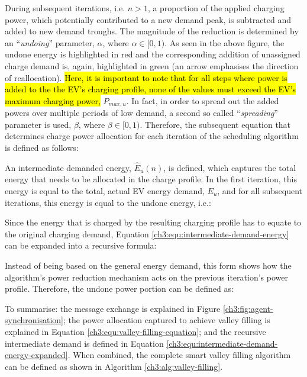 During subsequent iterations, i.e. $n>1$, a proportion of the applied charging power, which potentially contributed to a new demand peak, is subtracted and added to new demand troughs.
The magnitude of the reduction is determined by an ``\textit{undoing}'' parameter, $\alpha$, where $\alpha \in [0, 1)$.
As seen in the above figure, the undone energy is highlighted in red and the corresponding addition of unassigned charge demand is, again, highlighted in green (an arrow emphasises the direction of reallocation).
\hl{Here, it is important to note that for all steps where power is added to the the EV's charging profile, none of the values must exceed the EV's maximum charging power, }$P_{max,u}$.
In fact, in order to spread out the added powers over multiple periods of low demand, a second so called ``\textit{spreading}'' parameter is used, $\beta$, where $\beta \in [0, 1)$.
Therefore, the subsequent equation that determines charge power allocation for each iteration of the scheduling algorithm is defined as follows:



An intermediate demanded energy, $\hat{E}_u(n)$, is defined, which captures the total energy that needs to be allocated in the charge profile.
In the first iteration, this energy is equal to the total, actual EV energy demand, $E_u$, and for all subsequent iterations, this energy is equal to the undone energy, i.e.:



Since the energy that is charged by the resulting charging profile has to equate to the original charging demand, Equation \ref{ch3:equ:intermediate-demand-energy} can be expanded into a recursive formula:



Instead of being based on the general energy demand, this form shows how the algorithm's power reduction mechanism acts on the previous iteration's power profile.
Therefore, the undone power portion can be defined as:



To summarise: the message exchange is explained in Figure \ref{ch3:fig:agent-synchronisation}; the power allocation captured to achieve valley filling is explained in Equation \ref{ch3:equ:valley-filling-equation}; and the recursive intermediate demand is defined in Equation \ref{ch3:equ:intermediate-demand-energy-expanded}.
When combined, the complete smart valley filling algorithm can be defined as shown in Algorithm \ref{ch3:alg:valley-filling}.















